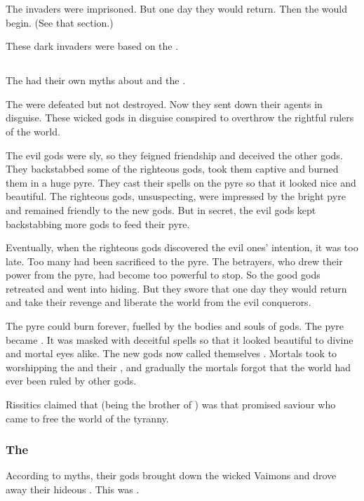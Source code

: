 The invaders were imprisoned. 
But one day they would return. 
Then the  would begin. 
(See that section.) 

These dark invaders were based on the \banes. 






\subsection{\Iquin}
The \Ortaicans had their own myths about \Iquin and the \sephiroth.

The  were defeated but not destroyed. 
Now they sent down their agents in disguise. 
These wicked gods in disguise conspired to overthrow the rightful rulers of the world. 

The evil gods were sly, so they feigned friendship and deceived the other gods. 
They backstabbed some of the righteous gods, took them captive and burned them in a huge pyre. 
They cast their spells on the pyre so that it looked nice and beautiful. 
The righteous gods, unsuspecting, were impressed by the bright pyre and remained friendly to the new gods. 
But in secret, the evil gods kept backstabbing more gods to feed their pyre. 

Eventually, when the righteous gods discovered the evil ones' intention, it was too late. 
Too many had been sacrificed to the pyre.
The betrayers, who drew their power from the pyre, had become too powerful to stop.
So the good gods retreated and went into hiding.
But they swore that one day they would return and take their revenge and liberate the world from the evil conquerors. 

The pyre could burn forever, fuelled by the bodies and souls of gods. 
The pyre became \iquin. 
It was masked with deceitful spells so that it looked beautiful to divine and mortal eyes alike.
The new gods now called themselves \sephiroth. 
Mortals took to worshipping the \sephiroth and their \iquin, and gradually the mortals forgot that the world had ever been ruled by other gods. 

Rissitics claimed that  (being the brother of ) was that promised saviour who came to free the world of the \iquinian tyranny. 





\subsubsection{The \HundredScourges}
According to \Ortaican myths, their gods brought down the wicked Vaimons and drove away their hideous \Archons. 
This was . 

